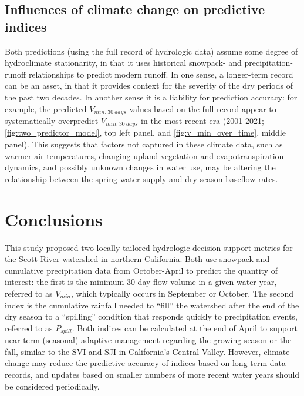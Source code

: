 \documentclass[
]{article}
\begin{document}
\hypertarget{influences-of-climate-change-on-predictive-indices}{%
\subsection{Influences of climate change on predictive
indices}\label{influences-of-climate-change-on-predictive-indices}}

Both predictions (using the full record of hydrologic data) assume some
degree of hydroclimate stationarity, in that it uses historical
snowpack- and precipitation-runoff relationships to predict modern
runoff. In one sense, a longer-term record can be an asset, in that it
provides context for the severity of the dry periods of the past two
decades. In another sense it is a liability for prediction accuracy: for
example, the predicted \(V_{min.~30~days}\) values based on the full
record appear to systematically overpredict \(V_{min.~30~days}\) in the
most recent era (2001-2021; \autoref{fig:two_predictor_model}, top left
panel, and \autoref{fig:v_min_over_time}, middle panel). This suggests
that factors not captured in these climate data, such as warmer air
temperatures, changing upland vegetation and evapotranspiration
dynamics, and possibly unknown changes in water use, may be altering the
relationship between the spring water supply and dry season baseflow
rates.

\hypertarget{conclusions}{%
\section{Conclusions}\label{conclusions}}

This study proposed two locally-tailored hydrologic decision-support
metrics for the Scott River watershed in northern California. Both use
snowpack and cumulative precipitation data from October-April to predict
the quantity of interest: the first is the minimum 30-day flow volume in
a given water year, referred to as \(V_{min}\), which typically occurs
in September or October. The second index is the cumulative rainfall
needed to ``fill'' the watershed after the end of the dry season to a
``spilling'' condition that responds quickly to precipitation events,
referred to as \(P_{spill}\). Both indices can be calculated at the end
of April to support near-term (seasonal) adaptive management regarding
the growing season or the fall, similar to the SVI and SJI in
California's Central Valley. However, climate change may reduce the
predictive accuracy of indices based on long-term data records, and
updates based on smaller numbers of more recent water years should be
considered periodically.
\end{document}
